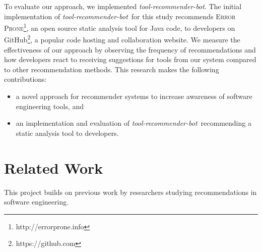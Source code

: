 \documentclass[sigconf,review,anonymous]{acmart}
\newcommand{\tool}{\textsl{tool-recommender-bot}}
\begin{document}

To evaluate our approach, we implemented \tool. The initial implementation of \tool~for this study recommends \textsc{Error Prone}\footnote{http://errorprone.info}, an open source static analysis tool for Java code, to developers on GitHub\footnote{https://github.com}, a popular code hosting and collaboration website. We measure the effectiveness of our approach by observing the frequency of recommendations and how developers react to receiving suggestions for tools from our system compared to other recommendation methods. This research makes the following contributions:

\begin{itemize}
 \item a novel approach for recommender systems to increase awareness of software engineering tools, and
 \item an implementation and evaluation of \tool~recommending a static analysis tool to developers.
 \end{itemize}

\section{Related Work}
This project builds on previous work by researchers studying recommendations in software engineering.
\end{document}
